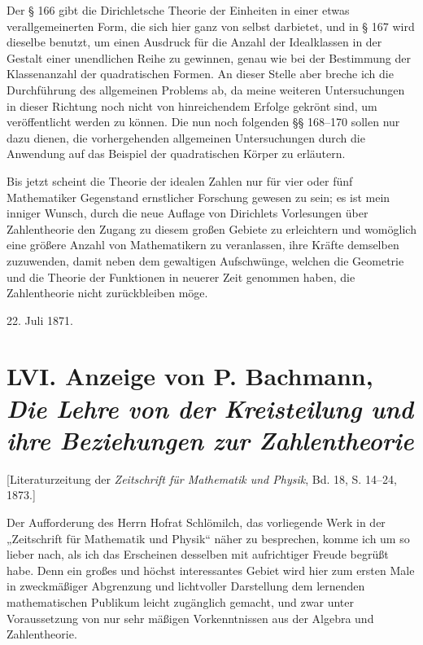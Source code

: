 \documentclass[11pt]{article}
\newcommand{\origpage}[1]{\par\vspace{0.25em}\noindent{\footnotesize\itshape [Gedruckte Seite #1]}\par\vspace{0.25em}}
\begin{document}
Der § 166 gibt die Dirichletsche Theorie der Einheiten in einer etwas verallgemeinerten Form, die sich hier ganz von selbst darbietet, und in § 167 wird dieselbe benutzt, um einen Ausdruck für die Anzahl der Idealklassen in der Gestalt einer unendlichen Reihe zu gewinnen, genau wie bei der Bestimmung der Klassenanzahl der quadratischen Formen. An dieser Stelle aber breche ich die Durchführung des allgemeinen Problems ab, da meine weiteren Untersuchungen in dieser Richtung noch nicht von hinreichendem Erfolge gekrönt sind, um veröffentlicht werden zu können. Die nun noch folgenden §§ 168--170 sollen nur dazu dienen, die vorhergehenden allgemeinen Untersuchungen durch die Anwendung auf das Beispiel der quadratischen Körper zu erläutern.

Bis jetzt scheint die Theorie der idealen Zahlen nur für vier oder fünf Mathematiker Gegenstand ernstlicher Forschung gewesen zu sein; es ist mein inniger Wunsch, durch die neue Auflage von Dirichlets Vorlesungen über Zahlentheorie den Zugang zu diesem großen Gebiete zu erleichtern und womöglich eine größere Anzahl von Mathematikern zu veranlassen, ihre Kräfte demselben zuzuwenden, damit neben dem gewaltigen Aufschwünge, welchen die Geometrie und die Theorie der Funktionen in neuerer Zeit genommen haben, die Zahlentheorie nicht zurückbleiben möge.

\begin{flushright}22. Juli 1871.\end{flushright}



\origpage{408}
\section*{LVI. Anzeige von P. Bachmann, \textit{Die Lehre von der Kreisteilung und ihre Beziehungen zur Zahlentheorie}}
\begin{center}\small [Literaturzeitung der \textit{Zeitschrift für Mathematik und Physik}, Bd. 18, S. 14--24, 1873.]\end{center}

Der Aufforderung des Herrn Hofrat Schlömilch, das vorliegende Werk in der „Zeitschrift für Mathematik und Physik“ näher zu besprechen, komme ich um so lieber nach, als ich das Erscheinen desselben mit aufrichtiger Freude begrüßt habe. Denn ein großes und höchst interessantes Gebiet wird hier zum ersten Male in zweckmäßiger Abgrenzung und lichtvoller Darstellung dem lernenden mathematischen Publikum leicht zugänglich gemacht, und zwar unter Voraussetzung von nur sehr mäßigen Vorkenntnissen aus der Algebra und Zahlentheorie.
\end{document}
